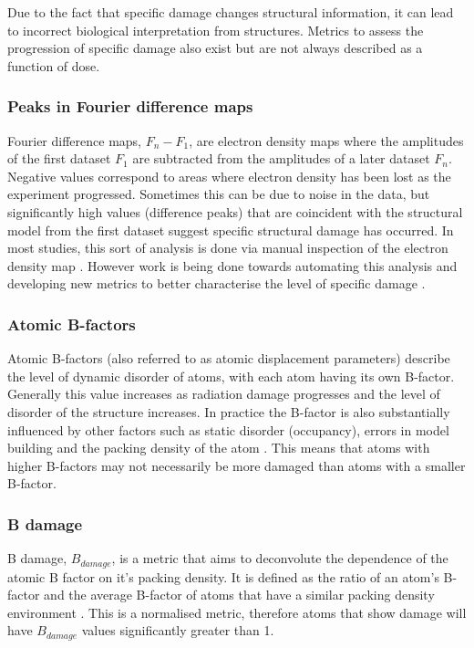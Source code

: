 		Due to the fact that specific damage changes structural information, it can lead to incorrect biological interpretation from structures.
		Metrics to assess the progression of specific damage also exist but are not always described as a function of dose.

        \subsubsection{Peaks in Fourier difference maps}
        \label{subs:Peaks in Fourier difference maps}
            Fourier difference maps, $F_n - F_1$, are electron density maps where the amplitudes of the first dataset $F_1$ are subtracted from the amplitudes of a later dataset $F_n$.
			Negative values correspond to areas where electron density has been lost as the experiment progressed.
			Sometimes this can be due to noise in the data, but significantly high values (difference peaks) that are coincident with the structural model from the first dataset suggest specific structural damage has occurred.
			In most studies, this sort of analysis is done via manual inspection of the electron density map \cite{burmeister2000structural,weik2000,ravelli2000}.
			However work is being done towards automating this analysis and developing new metrics to better characterise the level of specific damage \cite{bury2015radiation}.

        \subsubsection{Atomic B-factors}
        \label{subs:Atomic B-factors}
            Atomic B-factors (also referred to as atomic displacement parameters) describe the level of dynamic disorder of atoms, with each atom having its own B-factor.
			Generally this value increases as radiation damage progresses and the level of disorder of the structure increases.
			In practice the B-factor is also substantially influenced by other factors such as static disorder (occupancy), errors in model building and the packing density of the atom \cite{gerstel2015identifying}.
			This means that atoms with higher B-factors may not necessarily be more damaged than atoms with a smaller B-factor.

        \subsubsection{B damage}
        \label{subs:B damage}
            B damage, $B_{damage}$, is a metric that aims to deconvolute the dependence of the atomic B factor on it's packing density.
			It is defined as the ratio of an atom's B-factor and the average B-factor of atoms that have a similar packing density environment \cite{gerstel2015identifying}.
			This is a normalised metric, therefore atoms that show damage will have $B_{damage}$ values significantly greater than 1.

